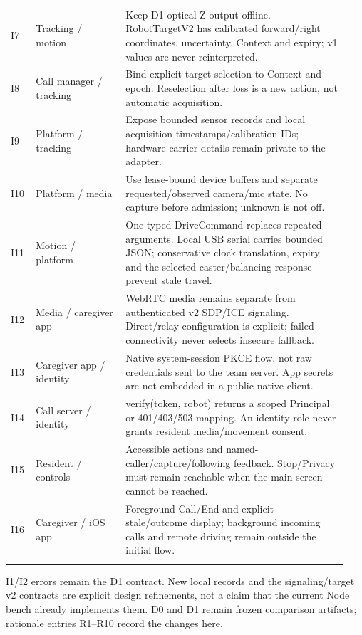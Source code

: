 \documentclass[12pt,letterpaper]{article}
\begin{document}
\begin{longtable}{@{}>{\RaggedRight\arraybackslash}p{0.07\linewidth}>{\RaggedRight\arraybackslash}p{0.25\linewidth}>{\RaggedRight\arraybackslash}p{0.62\linewidth}@{}}
I7 & Tracking / motion & Keep D1 optical-Z output offline. RobotTargetV2 has calibrated forward/right coordinates, uncertainty, Context and expiry; v1 values are never reinterpreted. \\ \addlinespace[3pt]
I8 & Call manager / tracking & Bind explicit target selection to Context and epoch. Reselection after loss is a new action, not automatic acquisition. \\ \addlinespace[3pt]
I9 & Platform / tracking & Expose bounded sensor records and local acquisition timestamps/calibration IDs; hardware carrier details remain private to the adapter. \\ \addlinespace[3pt]
I10 & Platform / media & Use lease-bound device buffers and separate requested/observed camera/mic state. No capture before admission; unknown is not off. \\ \addlinespace[3pt]
I11 & Motion / platform & One typed DriveCommand replaces repeated arguments. Local USB serial carries bounded JSON; conservative clock translation, expiry and the selected caster/balancing response prevent stale travel. \\ \addlinespace[3pt]
I12 & Media / caregiver app & WebRTC media remains separate from authenticated v2 SDP/ICE signaling. Direct/relay configuration is explicit; failed connectivity never selects insecure fallback. \\ \addlinespace[3pt]
I13 & Caregiver app / identity & Native system-session PKCE flow, not raw credentials sent to the team server. App secrets are not embedded in a public native client. \\ \addlinespace[3pt]
I14 & Call server / identity & verify(token, robot) returns a scoped Principal or 401/403/503 mapping. An identity role never grants resident media/movement consent. \\ \addlinespace[3pt]
I15 & Resident / controls & Accessible actions and named-caller/capture/following feedback. Stop/Privacy must remain reachable when the main screen cannot be reached. \\ \addlinespace[3pt]
I16 & Caregiver / iOS app & Foreground Call/End and explicit stale/outcome display; background incoming calls and remote driving remain outside the initial flow. \\ \addlinespace[3pt]
\end{longtable}\endgroup

I1/I2 errors remain the D1 contract. New local records and the signaling/target v2 contracts are explicit design refinements, not a claim that the current Node bench already implements them. D0 and D1 remain frozen comparison artifacts; rationale entries R1--R10 record the changes here.
\end{document}
